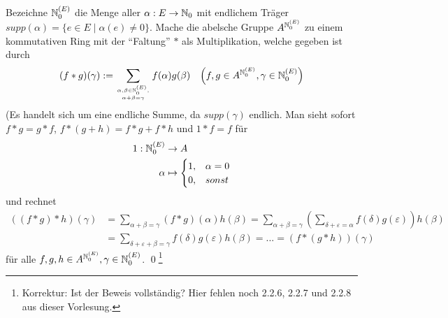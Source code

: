 \proof Bezeichne $\mathbb N_0^{(E)}$ die Menge aller $\alpha: E \to \mathbb N_0$ mit endlichem Träger $supp(\alpha) = \{ e\in E \mid \alpha(e) \neq 0 \}$. Mache die abelsche Gruppe $A^{\mathbb N_0^{(E)}}$ zu einem kommutativen Ring mit der "`Faltung"' $\ast$ als Multiplikation, welche gegeben ist durch 
\begin{align*}
	  (f \ast g)(\gamma):= \sum_{\alpha,\beta\in\mathbb N_0^{(E)}, \atop \alpha+\beta=\gamma} f(\alpha)g(\beta) && \left(f,g\in A^{\mathbb N_0^{(E)}}, \gamma \in \mathbb N_0^{(E)}\right)
\end{align*}
(Es handelt sich um eine endliche Summe, da $supp(\gamma)$ endlich. Man sieht sofort $f \ast g = g \ast f$, $f \ast (g+h) = f \ast g + f \ast h$ und $1 \ast f = f$ für
\begin{align*}
	1 : \mathbb N_0^{(E)} & \to A \\
	\alpha &\mapsto \begin{cases} 1, & \alpha = 0 \\ 0, & sonst \end{cases}
\end{align*}
und rechnet
\begin{align*}
	((f \ast g) \ast h)(\gamma) &= \sum_{\alpha+\beta=\gamma} (f \ast g)(\alpha)h(\beta)
 	= \sum_{\alpha+\beta=\gamma} \left( \sum_{\delta+\varepsilon=\alpha} f(\delta)g(\varepsilon) \right) h(\beta) \\
 	&= \sum_{\delta+\varepsilon+\beta=\gamma} f(\delta)g(\varepsilon)h(\beta)
 	= ... = (f \ast (g \ast h))(\gamma)
\end{align*}
für alle $f,g,h\in A^{\mathbb N_0^{(E)}}, \gamma \in\mathbb N_0^{(E)}$. \qed\footnote{Korrektur: Ist der Beweis vollständig? Hier fehlen noch 2.2.6, 2.2.7 und 2.2.8 aus dieser Vorlesung.}